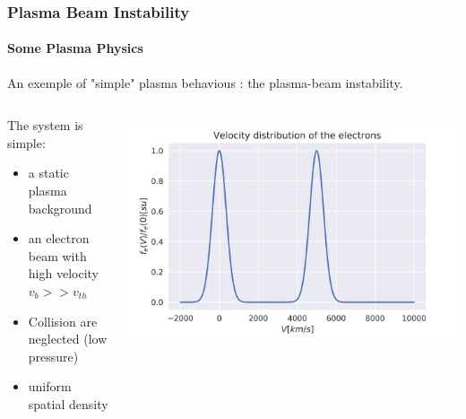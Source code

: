 \documentclass[sans, aspectratio=169]{beamer}
\begin{document}
\begin{frame}
	\frametitle{Plasma Beam Instability} 
	\framesubtitle{Some Plasma Physics} 

	An exemple of "simple" plasma behavious : the plasma-beam instability.

\begin{columns}

\begin{column}{0.55\linewidth}
The system is simple:
	\begin{itemize}
		\item a static plasma background
		\item an electron beam with high velocity $v_b >> v_{th}$
		\item Collision are neglected (low pressure)
		\item uniform spatial density
	\end{itemize}
\end{column}

\begin{column}{0.35\linewidth}
\includegraphics[scale=0.4]{images/plasma_beam_f_v.png} 
\end{column}

\end{columns}	

\end{frame}
\end{document}
